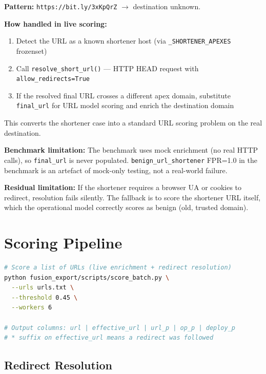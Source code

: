 \documentclass[11pt,a4paper]{article}
\newcommand{\code}[1]{\texttt{#1}}
\begin{document}
\textbf{Pattern:} \code{https://bit.ly/3xKpQrZ} $\rightarrow$
destination unknown.

\textbf{How handled in live scoring:}
\begin{enumerate}[noitemsep]
  \item Detect the URL as a known shortener host (via
        \code{\_SHORTENER\_APEXES} frozenset)
  \item Call \code{resolve\_short\_url()} --- HTTP HEAD request with
        \code{allow\_redirects=True}
  \item If the resolved final URL crosses a different apex domain,
        substitute \code{final\_url} for URL model scoring and enrich
        the destination domain
\end{enumerate}

This converts the shortener case into a standard URL scoring problem
on the real destination.

\textbf{Benchmark limitation:} The benchmark uses mock enrichment (no
real HTTP calls), so \code{final\_url} is never populated.
\code{benign\_url\_shortener} FPR=1.0 in the benchmark is an artefact
of mock-only testing, not a real-world failure.

\textbf{Residual limitation:} If the shortener requires a browser UA
or cookies to redirect, resolution fails silently. The fallback is to
score the shortener URL itself, which the operational model correctly
scores as benign (old, trusted domain).

\section{Scoring Pipeline}

\begin{lstlisting}[language=bash]
# Score a list of URLs (live enrichment + redirect resolution)
python fusion_export/scripts/score_batch.py \
  --urls urls.txt \
  --threshold 0.45 \
  --workers 6

# Output columns: url | effective_url | url_p | op_p | deploy_p
# * suffix on effective_url means a redirect was followed
\end{lstlisting}

\subsection{Redirect Resolution}
\end{document}
